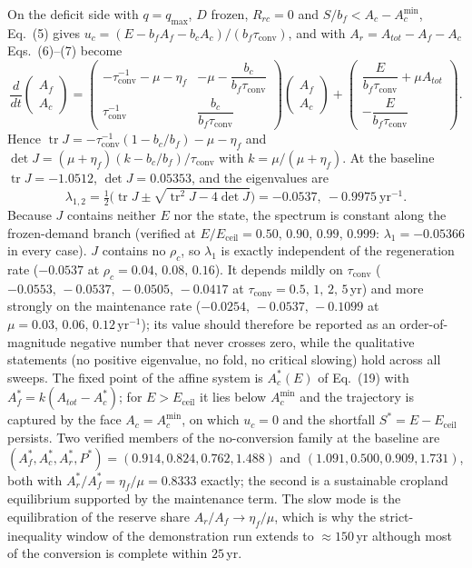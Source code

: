\documentclass[11pt,a4paper]{article}
\newcommand{\Eceil}{E_{\mathrm{ceil}}}
\newcommand{\Acmin}{A_c^{\min}}
\newcommand{\tconv}{\tau_{\mathrm{conv}}}
\begin{document}
On the deficit side with $q=q_{\max}$, $D$ frozen, $R_{rc}=0$ and $S/b_f<A_c-\Acmin$, Eq.~(5) gives $u_c=(E-b_fA_f-b_cA_c)/(b_f\tconv)$, and with $A_r=A_{tot}-A_f-A_c$ Eqs.~(6)--(7) become
\begin{equation}
\frac{d}{dt}\begin{pmatrix}A_f\\A_c\end{pmatrix}=
\begin{pmatrix}-\tconv^{-1}-\mu-\eta_f & -\mu-\dfrac{b_c}{b_f\tconv}\\[8pt]\tconv^{-1} & \dfrac{b_c}{b_f\tconv}\end{pmatrix}
\begin{pmatrix}A_f\\A_c\end{pmatrix}+
\begin{pmatrix}\dfrac{E}{b_f\tconv}+\mu A_{tot}\\[8pt]-\dfrac{E}{b_f\tconv}\end{pmatrix}.
\end{equation}
Hence $\operatorname{tr}J=-\tconv^{-1}(1-b_c/b_f)-\mu-\eta_f$ and $\det J=(\mu+\eta_f)(k-b_c/b_f)/\tconv$ with $k=\mu/(\mu+\eta_f)$. At the baseline $\operatorname{tr}J=-1.0512$, $\det J=0.05353$, and the eigenvalues are
\begin{equation}
\lambda_{1,2}=\tfrac12\Big(\operatorname{tr}J\pm\sqrt{\operatorname{tr}^2J-4\det J}\Big)=-0.0537,\ -0.9975\ \mathrm{yr}^{-1}.
\end{equation}
Because $J$ contains neither $E$ nor the state, the spectrum is constant along the frozen-demand branch (verified at $E/\Eceil=0.50,\,0.90,\,0.99,\,0.999$: $\lambda_1=-0.05366$ in every case). $J$ contains no $\rho_c$, so $\lambda_1$ is exactly independent of the regeneration rate ($-0.0537$ at $\rho_c=0.04,\,0.08,\,0.16$). It depends mildly on $\tconv$ ($-0.0553,\,-0.0537,\,-0.0505,\,-0.0417$ at $\tconv=0.5,\,1,\,2,\,5$\,yr) and more strongly on the maintenance rate ($-0.0254,\,-0.0537,\,-0.1099$ at $\mu=0.03,\,0.06,\,0.12\,\mathrm{yr}^{-1}$); its value should therefore be reported as an order-of-magnitude negative number that never crosses zero, while the qualitative statements (no positive eigenvalue, no fold, no critical slowing) hold across all sweeps. The fixed point of the affine system is $A_c^*(E)$ of Eq.~(19) with $A_f^*=k(A_{tot}-A_c^*)$; for $E>\Eceil$ it lies below $\Acmin$ and the trajectory is captured by the face $A_c=\Acmin$, on which $u_c=0$ and the shortfall $S^*=E-\Eceil$ persists. Two verified members of the no-conversion family at the baseline are $(A_f^*,A_c^*,A_r^*,P^*)=(0.914,0.824,0.762,1.488)$ and $(1.091,0.500,0.909,1.731)$, both with $A_r^*/A_f^*=\eta_f/\mu=0.8333$ exactly; the second is a sustainable cropland equilibrium supported by the maintenance term. The slow mode is the equilibration of the reserve share $A_r/A_f\to\eta_f/\mu$, which is why the strict-inequality window of the demonstration run extends to $\approx150$\,yr although most of the conversion is complete within $25$\,yr.
\end{document}
